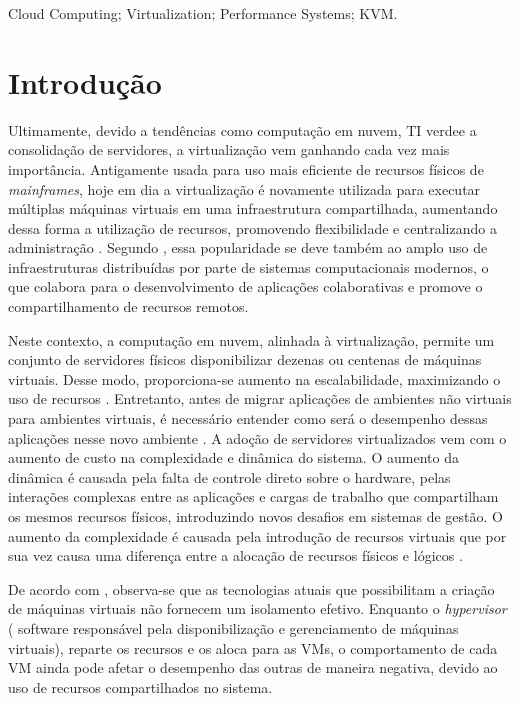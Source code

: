 \documentclass[[10pt,journal]{IEEEtran}
\begin{document}
\begin{IEEEkeywords}
Cloud Computing; Virtualization; Performance Systems; KVM.
\end{IEEEkeywords}

\IEEEpeerreviewmaketitle

\section{Introdução}

Ultimamente, devido a tendências como computação em nuvem, TI verde\footnotemark[1] e a consolidação de servidores, a virtualização vem ganhando cada vez mais importância. Antigamente usada para uso mais eficiente de recursos físicos de \textit{mainframes}, hoje em dia a virtualização é novamente utilizada para executar múltiplas máquinas virtuais em uma infraestrutura compartilhada, aumentando dessa forma a utilização de recursos, promovendo flexibilidade e centralizando a administração \cite{huber2011}. Segundo \cite{popiolek2012}, essa popularidade se deve também ao amplo uso de infraestruturas distribuídas por parte de sistemas computacionais modernos, o que colabora para o desenvolvimento de aplicações colaborativas e promove o compartilhamento de recursos remotos.

Neste contexto, a computação em nuvem, alinhada à virtualização, permite um conjunto de servidores físicos disponibilizar dezenas ou centenas de máquinas virtuais. Desse modo, proporciona-se aumento na escalabilidade, maximizando o uso de recursos  \cite{popiolek2012}. Entretanto, antes de migrar aplicações de ambientes não virtuais para ambientes virtuais, é necessário entender como será o desempenho dessas aplicações nesse novo ambiente \cite{benevuto2006}. A adoção de servidores virtualizados vem com o aumento de custo na complexidade e dinâmica do sistema. O aumento da dinâmica é causada pela falta de controle direto sobre o hardware, pelas interações complexas entre as aplicações e cargas de trabalho que compartilham os mesmos recursos físicos, introduzindo novos desafios em sistemas de gestão. O aumento da complexidade é causada pela introdução de recursos virtuais que por sua vez causa uma diferença entre a alocação de recursos físicos e lógicos \cite{huber2011}.

De acordo com \cite{koh2007}, observa-se que as tecnologias atuais que possibilitam a criação de máquinas virtuais não fornecem um isolamento efetivo. Enquanto o \textit{hypervisor} ( software responsável pela disponibilização e gerenciamento de máquinas virtuais), reparte os recursos e os aloca para as VMs, o comportamento de cada VM ainda pode afetar o desempenho das outras de maneira negativa, devido ao uso de recursos compartilhados no sistema.
\end{document}
